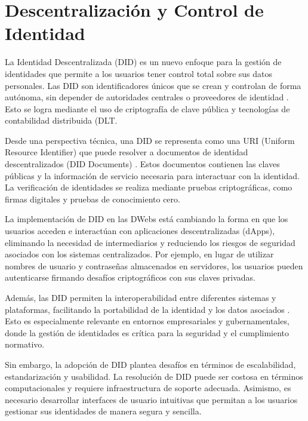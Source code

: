 \section{Descentralización y Control de Identidad}

La Identidad Descentralizada (DID) es un nuevo enfoque para la gestión de identidades que permite a los usuarios tener control total sobre sus datos personales. Las DID son identificadores únicos que se crean y controlan de forma autónoma, sin depender de autoridades centrales o proveedores de identidad \cite{preukschat2020self}. Esto se logra mediante el uso de criptografía de clave pública y tecnologías de contabilidad distribuida (DLT.

Desde una perspectiva técnica, una DID se representa como una URI (Uniform Resource Identifier) que puede resolver a documentos de identidad descentralizados (DID Documents) \cite{sporny2019did}. Estos documentos contienen las claves públicas y la información de servicio necesaria para interactuar con la identidad. La verificación de identidades se realiza mediante pruebas criptográficas, como firmas digitales y pruebas de conocimiento cero.

La implementación de DID en las DWebs está cambiando la forma en que los usuarios acceden e interactúan con aplicaciones descentralizadas (dApps), eliminando la necesidad de intermediarios y reduciendo los riesgos de seguridad asociados con los sistemas centralizados. Por ejemplo, en lugar de utilizar nombres de usuario y contraseñas almacenados en servidores, los usuarios pueden autenticarse firmando desafíos criptográficos con sus claves privadas.

Además, las DID permiten la interoperabilidad entre diferentes sistemas y plataformas, facilitando la portabilidad de la identidad y los datos asociados \cite{reed2016dkms}. Esto es especialmente relevante en entornos empresariales y gubernamentales, donde la gestión de identidades es crítica para la seguridad y el cumplimiento normativo.

Sin embargo, la adopción de DID plantea desafíos en términos de escalabilidad, estandarización y usabilidad. La resolución de DID puede ser costosa en términos computacionales y requiere infraestructura de soporte adecuada. Asimismo, es necesario desarrollar interfaces de usuario intuitivas que permitan a los usuarios gestionar sus identidades de manera segura y sencilla.

